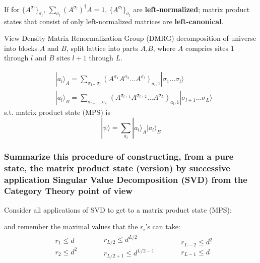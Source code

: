 If for $\lbrace A^{\sigma_l} \rbrace_{\sigma_l} $, $\sum_{\sigma_l} (A^{\sigma_l})^{\dag} A = 1$, $\lbrace A^{\sigma_l} \rbrace_{\sigma_l}$ are \textbf{left-normalized}; matrix product states that consist of only left-normalized matrices are \textbf{left-canonical}.  

View Density Matrix Renormalization Group (DMRG) decomposition of universe into blocks $A$ and $B$, split lattice into parts $A$,$B$, where $A$ compries sites $1$ through $l$ and $B$ sites $l+1$ through $L$.  

\[
\begin{aligned}
	& | a_l \rangle_A = \sum_{\sigma_1 \dots \sigma_l} (A^{\sigma_1} A^{\sigma_2} \dots A^{\sigma_l} )_{a_l,1} | \sigma_1 \dots \sigma_l \rangle \\ 
		& | a_l \rangle_B = \sum_{\sigma_{l+1} \dots \sigma_L} (A^{\sigma_{l+1}} A^{\sigma_{l+2}} \dots A^{\sigma_L} )_{a_l,1} | \sigma_{l+1} \dots \sigma_L \rangle 
\end{aligned}
\]
s.t. matrix product state (MPS) is 
\[
|\psi \rangle =\sum_{a_l} | a_l \rangle_A | a_l \rangle_B
\]

\subsubsection{Summarize this procedure of constructing, from a pure state, the matrix product state (version) by successive application Singular Value Decomposition (SVD) from the Category Theory point of view}

Consider all applications of SVD to get to a matrix product state (MPS): 
and remember the maximal values that the $r_i$'s can take:
\[
\begin{gathered}
	\begin{aligned}
& r_1 \leq d \\ 
	& r_2 \leq d^2 
\end{aligned}	 \qquad \, 	\begin{aligned}
& r_{L/2} \leq d^{L/2} \\ 
	& r_{L/2+1} \leq d^{L/2-1} 
\end{aligned} \qquad \, 	\begin{aligned}
& r_{L-2} \leq d^2 \\ 
	& r_{L-1} \leq d 
\end{aligned}
\end{gathered}
\]

